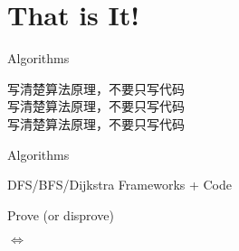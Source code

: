 \section{That is It!}

\begin{frame}{Algorithms}
  \begin{center}
  {\Large 写清楚算法原理，不要只写代码} \\[15pt]
  {\Large 写清楚算法原理，不要只写代码} \\[15pt]
  {\Large 写清楚算法原理，不要只写代码}
  \end{center}
\end{frame}
\begin{frame}{Algorithms}
  \centerline{\Large DFS/BFS/Dijkstra Frameworks + Code}
\end{frame}
\begin{frame}{Prove (or disprove)}
  \centerline{\huge $\iff$}
\end{frame}
